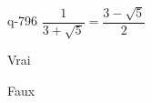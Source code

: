 \begin{truefalse}{q-796}
$\dfrac{1}{3+\sqrt{5}}=\dfrac{3-\sqrt{5}}{2}$
\item Vrai
\item* Faux
\end{truefalse}

